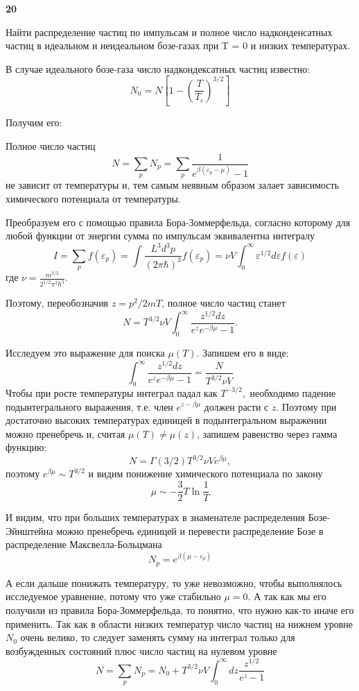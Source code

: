\documentclass[a4paper,12pt]{article} %
\begin{document}
\begin{ttask} \textbf{20}

Найти распределение частиц по импульсам и полное число надконденсатных частиц в идеальном и неидеальном бозе-газах при T = 0 и низких температурах.





В случае идеального бозе-газа число надкондексатных частиц известно:
\[ N_{0}=N\left[1-\left(\frac{T}{T_{c}}\right)^{3 / 2}\right] 
\]

Получим его:


Полное число частиц
$$
N=\sum_{p} N_{p}=\sum_{p} \frac{1}{e^{\beta\left(\varepsilon_{p}-\mu\right)}-1}
$$
не зависит от температуры и, тем самым неявным образом залает зависимость химического потенциала от температуры. 

Преобразуем его с помощью правила Бора-Зоммерфельда, согласно которому для любой функции 
от энергии сумма по импульсам эквивалентна интегралу
$$
I=
\sum_{p} f\left(\varepsilon_{p}\right)=
\int \frac{L^{3} d^{3} p}{(2 \pi \hbar)^{3}} f\left(\varepsilon_{p}\right)=
\nu V \int_{0}^{\infty} \varepsilon^{1 / 2} d \varepsilon f(\varepsilon)
$$
где $\nu=\frac{m^{3 / 2}}{2^{1 / 2} \pi^{2} \hbar^{3}} .$ 


Поэтому, переобозначив $z=p^{2} / 2 m T$, полное число частиц станет
$$
N=T^{3 / 2} \nu V \int_{0}^{\infty} \frac{z^{1 / 2} d z}{e^{z} e^{-\beta \mu}-1}.
$$


Исследуем это выражение для поиска $ \mu(T) $. 
Запишем его в виде:
$$
\int_{0}^{\infty} \frac{z^{1 / 2} d z}{e^{z} e^{-\beta \mu}-1}=\frac{N}{T^{3 / 2} \nu V}
$$
Чтобы при росте температуры интеграл падал как $T^{-3 / 2},$ необходимо падение подынтегрального выражения, 
т.е. член $e^{z-\beta \mu}$ должен расти с $z$.
Поэтому при достаточно высоких температурах единицей в 
подынтегральном выражении можно пренебречь и, считая $ \mu(T)\ne \mu(z)$, 
запишем равенство через гамма функцию:
%
$$
N=\Gamma(3 / 2) T^{3 / 2} \nu V e^{\beta \mu},
$$
поэтому $e^{\beta \mu} \sim T^{3 / 2}$ и видим понижение химического потенциала по закону
$$
\mu \sim-\frac{3}{2} T \ln \frac{1}{T}
$$

И видим, что при больших температурах в знаменателе распределения Бозе-Эйнштейна можно пренебречь единицей и перевести 
распределение Бозе в распределение Максвелла-Больцмана
$$
N_{p}=e^{\beta\left(\mu-\varepsilon_{p}\right)}
$$


А если дальше понижать температуру, то уже невозможно, чтобы выполнялось исследуемое уравнение, 
потому что уже стабильно $\mu=0 .$ 
А так как мы его получили из правила Бора-Зоммерфельда, то понятно, что нужно как-то иначе его применить.
Так как в области низких температур число частиц на нижнем уровне $N_{0}$ очень велико, 
то следует заменять сумму на интеграл только для возбужденных состояний плюс число частиц на нулевом уровне
$$
N=\sum_{p} N_{p}
=
N_{0}+T^{3 / 2} \nu V 
\int_{0}^{\infty} d z 
\frac{z^{1 / 2}}{e^{z}-1}
$$



\end{ttask}
\end{document}
